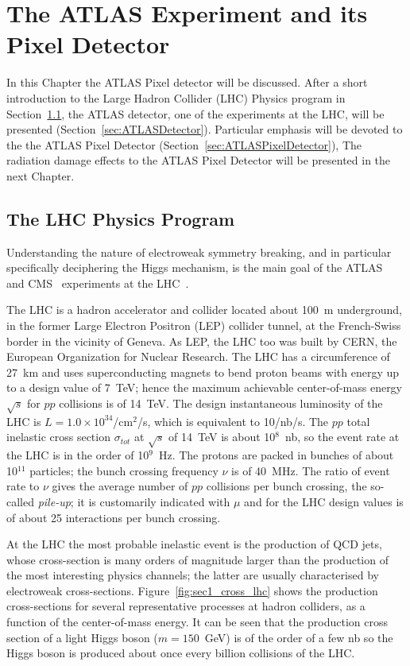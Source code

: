 \chapter{The ATLAS Experiment and its Pixel Detector}
\label{chap:ATLAS}

In this Chapter the ATLAS Pixel detector will be discussed.
After a short introduction to the Large Hadron Collider (LHC) Physics program in 
Section~\ref{sec:LHCPhysics}, the ATLAS detector, one of the experiments at the LHC, will be 
presented (Section~\ref{sec:ATLASDetector}). Particular emphasis will be devoted to the 
the ATLAS Pixel Detector (Section~\ref{sec:ATLASPixelDetector}),
The radiation damage effects to the ATLAS Pixel Detector will be presented 
in the next  Chapter.

\section{The LHC Physics Program}
\label{sec:LHCPhysics}
Understanding the nature of electroweak symmetry breaking, and in particular  specifically 
deciphering the Higgs mechanism, is the main goal of the ATLAS~\cite{AtlasDetector} and 
CMS~\cite{CMSDetector} experiments at the LHC~\cite{LHCMachine}. 

The LHC is a hadron accelerator and collider located about 100~m underground, in the former 
Large Electron Positron (LEP) collider tunnel, at the French-Swiss border in the vicinity of Geneva. As LEP, 
the LHC too was built by CERN, the European 
Organization for Nuclear Research. The LHC has a circumference of 27~km and uses 
superconducting magnets to bend proton beams with energy up to a design value of 7~TeV; hence 
the maximum achievable center-of-mass energy $\sqrt{s}$ for $pp$ collisions is of 14~TeV. The design instantaneous 
luminosity of the LHC is  $L=1.0\times10^{34}$/cm$^{2}$/s, which is equivalent to 10/nb/s. 
The $pp$ total inelastic  cross section $\sigma_{tot}$ at $\sqrt{s}$ of 14~TeV is about 10$^8$~nb, 
so the event rate at the LHC is in the order of 10$^9$~Hz. 
The protons are packed in bunches of about 10$^{11}$ particles; the bunch crossing frequency $\nu$ is 
of 40~MHz.  The ratio of event rate to $\nu$ gives the average number of $pp$ collisions per 
bunch crossing, the so-called {\it pile-up}; it is customarily indicated with $\mu$ and for the LHC 
design values is of about 25 interactions per bunch crossing.

At the LHC the most probable inelastic event is the production of QCD jets, whose   cross-section is  many orders of magnitude larger than the production of the
most interesting physics
channels; the latter are usually characterised by electroweak cross-sections. Figure~\ref{fig:sec1_cross_lhc} shows the production cross-sections for several
representative processes at hadron colliders, as a function of the center-of-mass energy.
It can be seen that the  production cross section of a light Higgs boson ($m=150$~GeV) is of the order of a 
few  nb so the Higgs boson is produced about once every billion collisions of the LHC.

